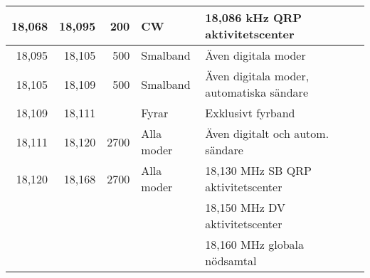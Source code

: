 \begin{landscape}
\begin{tabular}{rrrll}
18,068 & 18,095 & 200  & CW         & 18,086 kHz QRP aktivitetscenter          \\ \hline
18,095 & 18,105 & 500  & Smalband   & Även digitala moder                      \\ \hline
18,105 & 18,109 & 500  & Smalband   & Även digitala moder, automatiska sändare \\ \hline
18,109 & 18,111 &      & Fyrar      & Exklusivt fyrband                        \\ \hline
18,111 & 18,120 & 2700 & Alla moder & Även digitalt och autom. sändare         \\ \hline
18,120 & 18,168 & 2700 & Alla moder & 18,130 MHz SB QRP aktivitetscenter       \\
       &        &      &            & 18,150 MHz DV aktivitetscenter           \\
       &        &      &            & 18,160 MHz globala nödsamtal             \\ \hline

\end{tabular}
\clearpage

\small

\end{landscape}
